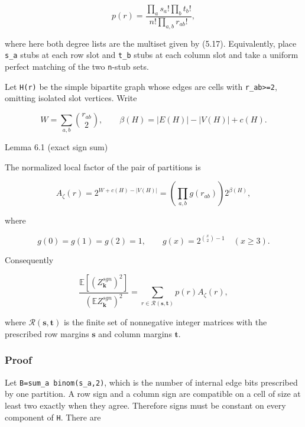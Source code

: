 \documentclass[
  11pt,
  a4paper,
]{article}
\begin{document}
\[
 p(r)=\frac{\prod_a s_a!\prod_b t_b!}
            {n!\prod_{a,b}r_{ab}!},                      \tag{6.2}
\]

where here both degree lists are the multiset given by (5.17).
Equivalently, place \texttt{s\_a} stubs at each row slot and
\texttt{t\_b} stubs at each column slot and take a uniform perfect
matching of the two \texttt{n}-stub sets.

Let \texttt{H(r)} be the simple bipartite graph whose edges are cells
with \texttt{r\_ab\textgreater{}=2}, omitting isolated slot vertices.
Write

\[
 W=\sum_{a,b}\binom{r_{ab}}2,\qquad
 \beta(H)=|E(H)|-|V(H)|+c(H).                             \tag{6.3}
\]

{}
\label{lemma-6.1-exact-sign-sum}
\begin{lemmabox}{Lemma 6.1 (exact sign sum)}

The normalized local factor of the pair of partitions is

\[
 A_\zeta(r)=2^{W+c(H)-|V(H)|}
 =\left(\prod_{a,b}g(r_{ab})\right)2^{\beta(H)},          \tag{6.4}
\]

where

\[
 g(0)=g(1)=g(2)=1,\qquad
 g(x)=2^{\binom x2-1}\quad(x\ge3).                       \tag{6.5}
\]

Consequently

\[
 \frac{\mathbb E\!\left[(Z_{\mathbf k}^{sgn})^2\right]}
       {(\mathbb EZ_{\mathbf k}^{sgn})^2}
 =\sum_{r\in\mathcal R(\mathbf s,\mathbf t)}
      p(r)A_\zeta(r),                                    \tag{6.6}
\]

where \(\mathcal R(\mathbf s,\mathbf t)\) is the finite set of
nonnegative integer matrices with the prescribed row margins
\(\mathbf s\) and column margins \(\mathbf t\).

\end{lemmabox}

\subsubsection{Proof}\label{proof-3}

Let
\texttt{B=}\allowbreak{}\texttt{sum\_}\allowbreak{}\texttt{a\ binom(s\_}\allowbreak{}\texttt{a,}\allowbreak{}\texttt{2)},
which is the number of internal edge bits prescribed by one partition. A
row sign and a column sign are compatible on a cell of size at least two
exactly when they agree. Therefore signs must be constant on every
component of \texttt{H}. There are
\end{document}
